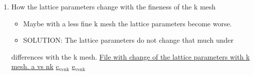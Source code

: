 \documentclass[11pt]{article}
\begin{document}
\begin{enumerate}
\item How the lattice parameters change with the fineness of the k mesh
\label{sec:org45bef6a}
\begin{itemize}
\item Maybe with a less fine k mesh the lattice parameters become
worse.
\item SOLUTION: The lattice parameters do not change that much under
\end{itemize}
differences with the k mesh. \href{file:///home/tigany/Documents/disl\_gsurf/hcp\_pris\_screw/hcp\_relaxed\_pris\_screw/gamma\_surfaces/get\_hom\_shear\_bc\_gs.py}{File with change of the lattice
parameters with k mesh. }
\href{file:///home/tigany/Documents/disl\_gsurf/hcp\_pris\_screw/hcp\_relaxed\_pris\_screw/gamma\_surfaces/a\_hcp\_vs\_nk.png}{a vs nk}
\href{file:///home/tigany/Documents/disl\_gsurf/hcp\_pris\_screw/hcp\_relaxed\_pris\_screw/gamma\_surfaces/c\_hcp\_vs\_nk.png}{c\(_{\text{vs}}\)\(_{\text{nk}}\)}
\href{file:///home/tigany/Documents/disl\_gsurf/hcp\_pris\_screw/hcp\_relaxed\_pris\_screw/gamma\_surfaces/e\_hcp\_vs\_nk.png}{e\(_{\text{vs}}\)\(_{\text{nk}}\)}


\end{enumerate}
\end{document}
